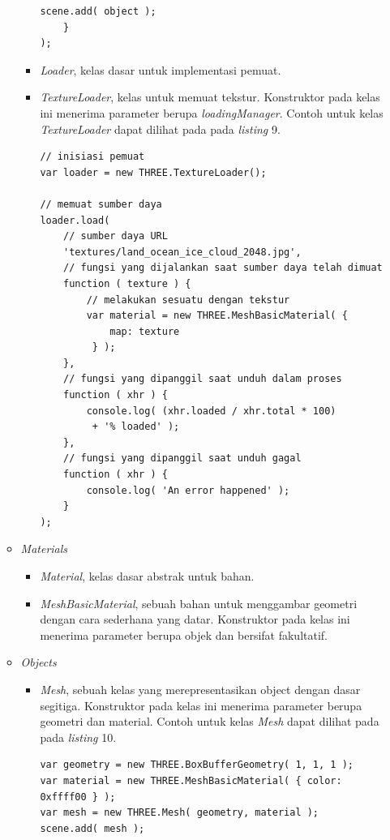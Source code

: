 \documentclass[a4paper,twoside]{article}
\begin{document}
\begin{enumerate}
\begin{itemize}
\begin{itemize}
\begin{lstlisting}[caption={Contoh penggunaan kelas {\it JSONLoader}.},captionpos=b]
		scene.add( object );
	}
);
\end{lstlisting}

	\item {\it Loader}, kelas dasar untuk implementasi pemuat.
	
	\item {\it TextureLoader}, kelas untuk memuat tekstur. Konstruktor pada kelas ini menerima parameter berupa  {\it loadingManager}. Contoh untuk kelas {\it TextureLoader} dapat dilihat pada pada {\it listing} 9.
	
\begin{lstlisting}[caption={Contoh penggunaan kelas {\it TextureLoader}.},captionpos=b]
// inisiasi pemuat
var loader = new THREE.TextureLoader();

// memuat sumber daya
loader.load(
	// sumber daya URL
	'textures/land_ocean_ice_cloud_2048.jpg',
	// fungsi yang dijalankan saat sumber daya telah dimuat
	function ( texture ) {
		// melakukan sesuatu dengan tekstur
		var material = new THREE.MeshBasicMaterial( {
			map: texture
		 } );
	},
	// fungsi yang dipanggil saat unduh dalam proses
	function ( xhr ) {
		console.log( (xhr.loaded / xhr.total * 100)
		 + '% loaded' );
	},
	// fungsi yang dipanggil saat unduh gagal
	function ( xhr ) {
		console.log( 'An error happened' );
	}
);
\end{lstlisting}
	\end{itemize}

\item \textit{Materials}

	\begin{itemize}
	\item {\it Material}, kelas dasar abstrak untuk bahan.
	
	\item {\it MeshBasicMaterial}, sebuah bahan untuk menggambar geometri dengan cara sederhana yang datar. Konstruktor pada kelas ini menerima parameter berupa objek dan bersifat fakultatif.
	\end{itemize}

\item \textit{Objects}
	\begin{itemize}
	\item {\it Mesh}, sebuah kelas yang merepresentasikan object dengan dasar segitiga. Konstruktor pada kelas ini menerima parameter berupa geometri dan material. Contoh untuk kelas {\it Mesh} dapat dilihat pada pada {\it listing} 10.
	
\begin{lstlisting}[caption={Contoh penggunaan kelas {\it Mesh}.},captionpos=b]
var geometry = new THREE.BoxBufferGeometry( 1, 1, 1 );
var material = new THREE.MeshBasicMaterial( { color: 0xffff00 } );
var mesh = new THREE.Mesh( geometry, material );
scene.add( mesh );
\end{lstlisting}
	\end{itemize}


\end{itemize}
\end{enumerate}
\end{document}
